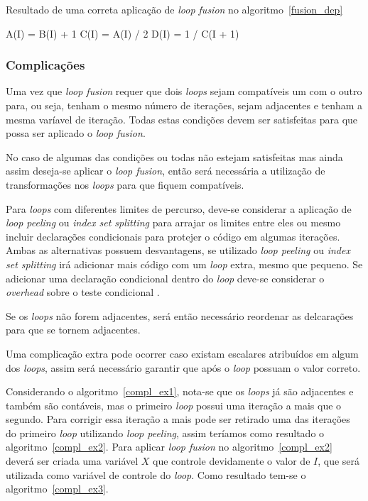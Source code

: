 \begin{algorithm}
\caption{Resultado de uma correta aplicação de \textit{loop fusion} no 
        algoritmo~\ref{fusion_dep}} 
\label{fusion_dep3}
\begin{algorithmic}[1]

\STATE A(I) = B(I) + 1
\STATE C(I) = A(I) / 2
\ENDFOR
{}
\STATE D(I) = 1 / C(I + 1)
\ENDFOR

\end{algorithmic}
\end{algorithm}


\subsubsection{Complicações}

Uma vez que \textit{loop fusion} requer que dois \textit{loops} sejam
compatíveis um com o outro para, ou seja, tenham o mesmo número de iterações,
sejam adjacentes e tenham a mesma varíavel de iteração.
Todas estas condições devem ser satisfeitas para que possa ser aplicado o
\textit{loop fusion}.

No caso de algumas das condições ou todas não estejam satisfeitas mas ainda
assim deseja-se aplicar o \textit{loop fusion}, então será necessária a
utilização de transformações nos \textit{loops} para que fiquem compatíveis.

Para \textit{loops} com diferentes limites de percurso, deve-se considerar a
aplicação de \textit{loop peeling} ou \textit{index set splitting} para arrajar
os limites entre eles ou mesmo incluir declarações condicionais para protejer o
código em algumas iterações.
Ambas as alternativas possuem desvantagens, se utilizado \textit{loop peeling}
ou \textit{index set splitting} irá adicionar mais código com um \textit{loop}
extra, mesmo que pequeno. Se adicionar uma declaração condicional dentro do
\textit{loop} deve-se considerar o \textit{overhead} sobre o teste condicional
\cite{Rivera:1999}.

Se os \textit{loops} não forem adjacentes, será então necessário reordenar as
delcarações para que se tornem adjacentes.

Uma complicação extra pode ocorrer caso existam escalares atribuídos em algum
dos \textit{loops}, assim será necessário garantir que após o \textit{loop}
possuam o valor correto.

Considerando o algoritmo~\ref{compl_ex1}, nota-se que os \textit{loops} já são
adjacentes e também são contáveis, mas o primeiro \textit{loop} possui uma
iteração a mais que o segundo. Para corrigir essa iteração a mais pode ser
retirado uma das iterações do primeiro \textit{loop} utilizando 
\textit{loop peeling}, assim teríamos como resultado o algoritmo~\ref{compl_ex2}. 
Para aplicar \textit{loop fusion} no algoritmo~\ref{compl_ex2} deverá ser
criada uma variável $X$ que controle devidamente o valor de $I$, que será utilizada
como variável de controle do \textit{loop}. Como resultado tem-se o
algoritmo~\ref{compl_ex3}.

